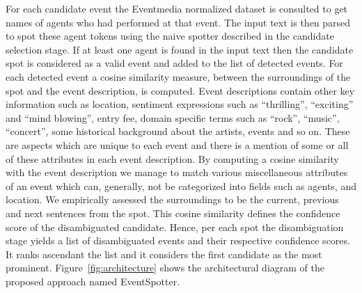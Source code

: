 \documentclass[10pt,a4paper]{article}
\begin{document}
For each candidate event the Eventmedia normalized dataset is consulted to get names of agents who had performed at that event. The input text is then parsed to spot these agent tokens using the naive spotter described in the candidate selection stage. If at least one agent is found in the input text then the candidate spot is considered as a valid event and added to the list of detected events. For each detected event a cosine similarity measure,  between the surroundings of the spot and the event description, is computed. Event descriptions contain other key information such as location, sentiment expressions such as ``thrilling'', ``exciting'' and ``mind blowing'', entry fee, domain specific terms such as ``rock'', ``music'', ``concert'', some historical background about the artists, events and so on. These are aspects which are unique to each event and there is a mention of some or all of these attributes in each event description. By computing a cosine similarity with the event description we manage to match various miscellaneous attributes of an event which can, generally, not be categorized into fields such as agents, and location. We empirically assessed the surroundings to be the current, previous and next sentences from the spot. This cosine similarity defines the confidence score of the disambiguated candidate. Hence, per each spot the disambiguation stage yields a list of disambiguated events and their respective confidence scores. It ranks ascendant the list and it considers the first candidate as the most prominent.
Figure~\ref{fig:architecture} shows the architectural diagram of the proposed approach named EventSpotter. 
\end{document}

